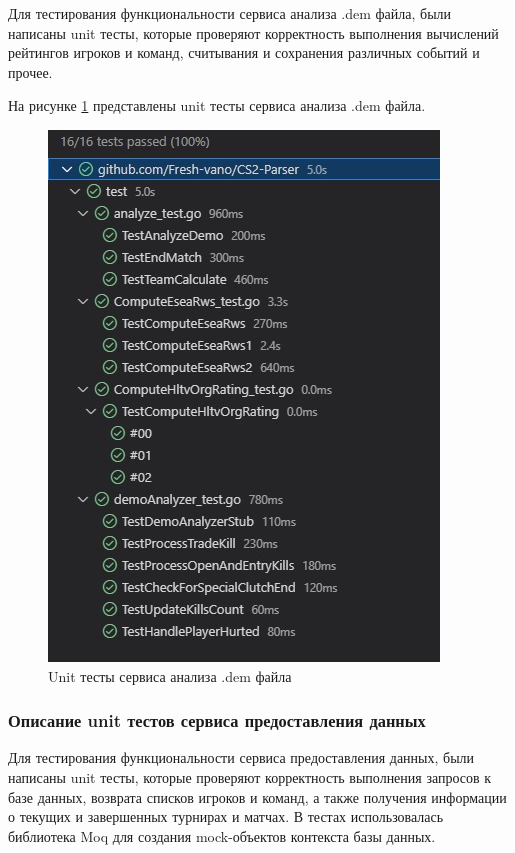 Для тестирования функциональности сервиса анализа .dem файла, были написаны unit тесты, которые проверяют корректность выполнения вычислений рейтингов игроков и команд, считывания и сохранения различных событий и прочее.

На рисунке \ref{fig:-UnitTestParser} представлены unit тесты сервиса анализа .dem файла.

\begin{figure}
	\centering
	\includegraphics[width=0.9\linewidth]{"images/UnitTestParser"}
	\caption{Unit тесты сервиса анализа .dem файла}
	\label{fig:-UnitTestParser}
\end{figure}

\subsubsection{Описание unit тестов сервиса предоставления данных}

Для тестирования функциональности сервиса предоставления данных, были написаны unit тесты, которые проверяют корректность выполнения запросов к базе данных, возврата списков игроков и команд, а также получения информации о текущих и завершенных турнирах и матчах. В тестах использовалась библиотека Moq для создания mock-объектов контекста базы данных.

